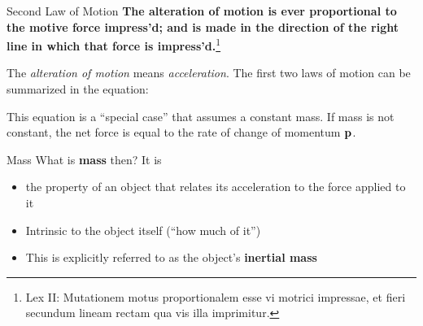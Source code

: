 \documentclass[12pt,compress,aspectratio=169]{beamer}
\newcommand{\mb}[1]{\ensuremath\mathbf{#1}}
\newcommand{\eq}[2]{\vspace{#1}{\Large\begin{displaymath}#2\end{displaymath}}}
\begin{document}
\begin{frame}{Second Law of Motion}
  \textbf{The alteration of motion is ever proportional to the motive force
    impress'd; and is made in the direction of the right line in which that
    force is impress'd.}\footnote{Lex II: Mutationem motus proportionalem esse
    vi motrici impressae, et fieri secundum lineam rectam qua vis illa
    imprimitur.}

  \vspace{.2in}The \emph{alteration of motion} means \emph{acceleration}. The
  first two laws of motion can be summarized in the equation:

  \eq{-.2in}{
    \boxed{\mb{F}_{\textrm{net}}=\Sigma\mb{F}=m\mb{a}}
  }

  \vspace{-.15in}\textcolor{red!80!black}{This equation is a ``special case''
    that assumes a constant mass.} If mass is not constant, the net force is
  equal to the rate of change of momentum $\mb{p}$.

  \eq{-.2in}{
    \mb{F}_\mathrm{net}=\frac{d\mb{p}}{dt}
  }
\end{frame}


\begin{frame}{Mass}
  What is \textbf{mass} then? It is
  \begin{itemize}
    \item the property of an object that relates its acceleration to the force
      applied to it
    \item Intrinsic to the object itself (``how much of it'')
    \item This is explicitly referred to as the object's \textbf{inertial mass}
  \end{itemize}
\end{frame}
\end{document}
